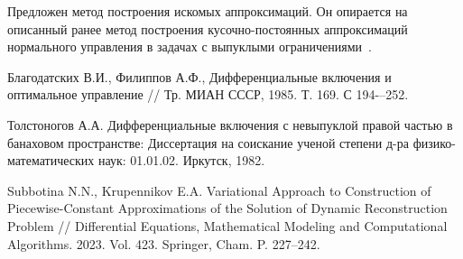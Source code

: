 Предложен метод построения искомых аппроксимаций. Он опирается на описанный ранее метод построения кусочно-постоянных аппроксимаций нормального управления в задачах с выпуклыми ограничениями~\cite{Krupennikov:subb4}.





%



\begin{thebibliography}{9} %

Благодатских В.И., Филиппов А.Ф., Дифференциальные включения и оптимальное управление // Тр. МИАН СССР, 1985. Т. 169. С 194-–252.


 Толстоногов А.А. Дифференциальные включения с невыпуклой правой частью в банаховом пространстве: Диссертация на соискание ученой степени д-ра физико-математических наук: 01.01.02. Иркутск, 1982.



	Subbotina N.N., Krupennikov E.A. Variational Approach to Construction of Piecewise-Constant Approximations of the Solution of Dynamic Reconstruction Problem  // Differential Equations, Mathematical Modeling and Computational Algorithms. 2023. Vol. 423. Springer, Cham. P. 227--242.
\end{thebibliography}





%

